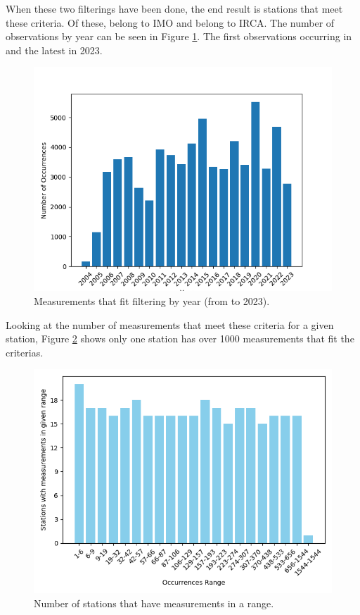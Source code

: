 When these two filterings have been done, the end result is \nStationsMin stations that meet these criteria. Of these, \nVedurMin belong to IMO and \nVGMin belong to IRCA. The number of observations by year can be seen in Figure \ref{fig:occurrences_by_year}. The first observations occurring in \startDateVedur and the latest in 2023.

\begin{figure}
    \begin{center}
        \includegraphics[scale = 0.75]{Figures/occurrences_by_year.png}
    \end{center}
    \caption{Measurements that fit filtering by year (from \startDateVedur to 2023).}
    \label{fig:occurrences_by_year}
\end{figure}

Looking at the number of measurements that meet these criteria for a given station, Figure \ref{fig:occurrences_by_station_20} shows only one station has over 1000 measurements that fit the criterias.

\begin{figure}
    \begin{center}
        \includegraphics[scale = 0.75]{Figures/station_occurrences_20.png}        
    \end{center}
    \caption{Number of stations that have measurements in a range.}
    \label{fig:occurrences_by_station_20}
\end{figure}

